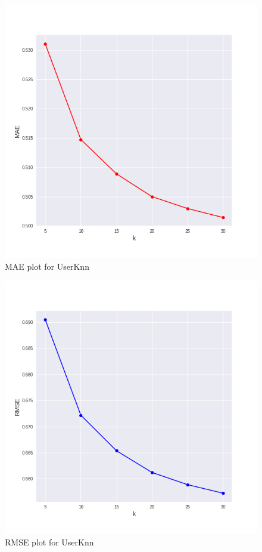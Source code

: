 \documentclass[letterpaper, 10 pt, conference]{ieeeconf}  %
\begin{document}
\begin{figure}[h]
            \includegraphics[scale=0.4]{MAE_userKnn.png}
            \centering
            \caption{MAE plot for UserKnn}
            \label{fig:MAE_UserKnn}
        \end{figure}
 \begin{figure}[h]
            \includegraphics[scale=0.4]{RMSE_userKnn.png}
            \centering
            \caption{RMSE plot for UserKnn}
            \label{fig:RMSE_UserKnn}
        \end{figure} 
\end{document}
